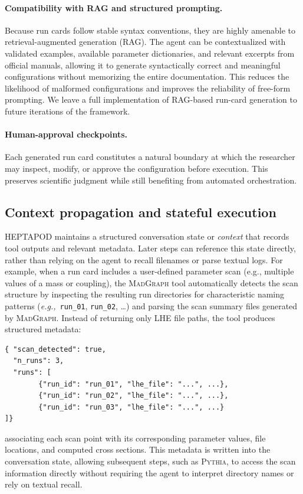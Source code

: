\documentclass[11pt,oneside]{article}
\numberwithin{equation}{section}
\newcommand{\pkgname}{HEPTAPOD\xspace}
\begin{document}
\paragraph{Compatibility with RAG and structured prompting.}
Because run cards follow stable syntax conventions, they are highly amenable to retrieval-augmented generation (RAG). The agent can be contextualized with validated examples, available parameter dictionaries, and relevant excerpts from official manuals, allowing it to generate syntactically correct and meaningful configurations without memorizing the entire documentation. This reduces the likelihood of malformed configurations and improves the reliability of free-form prompting. 
We leave a full implementation of RAG-based run-card generation to future iterations of the framework.

\paragraph{Human-approval checkpoints.}
Each generated run card constitutes a natural boundary at which the researcher may inspect, modify, or approve the configuration before execution. This preserves scientific judgment while still benefiting from automated orchestration.

\subsection{Context propagation and stateful execution}
\label{subsec:context}

\pkgname maintains a structured conversation state or \emph{context} that records tool outputs and relevant metadata. Later steps can reference this state directly, rather than relying on the agent to recall filenames or parse textual logs. For example, when a run card includes a user-defined parameter scan (e.g., multiple values of a mass or coupling), the \textsc{MadGraph} tool automatically detects the scan structure by inspecting the resulting run directories for characteristic naming patterns (\textit{e.g.,}~\texttt{run\_01}, \texttt{run\_02}, \ldots) and parsing the scan summary files generated by \textsc{MadGraph}.
Instead of returning only LHE file paths, the tool produces structured metadata:
\medskip
\begin{graybox}
\begin{verbatim}
{ "scan_detected": true,
  "n_runs": 3,
  "runs": [
        {"run_id": "run_01", "lhe_file": "...", ...},
        {"run_id": "run_02", "lhe_file": "...", ...},
        {"run_id": "run_03", "lhe_file": "...", ...}
]}
\end{verbatim}
\end{graybox}
associating each scan point with its corresponding parameter values, file locations, and computed cross sections.
This metadata is written into the conversation state, allowing subsequent steps, such as \textsc{Pythia}, to access the scan information directly without requiring the agent to interpret directory names or rely on textual recall.
\end{document}

